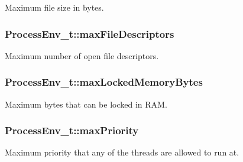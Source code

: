 Maximum file size in bytes. 

\subsubsection[{\texorpdfstring{max\+File\+Descriptors}{maxFileDescriptors}}]{ Process\+Env\+\_\+t\+::max\+File\+Descriptors}\hypertarget{struct_process_env__t_a988754ace3b62b5cafe7e3da54722ace}{}\label{struct_process_env__t_a988754ace3b62b5cafe7e3da54722ace}


Maximum number of open file descriptors. 

\subsubsection[{\texorpdfstring{max\+Locked\+Memory\+Bytes}{maxLockedMemoryBytes}}]{ Process\+Env\+\_\+t\+::max\+Locked\+Memory\+Bytes}\hypertarget{struct_process_env__t_a360a673bc3137fc006bfc9dfa56316ab}{}\label{struct_process_env__t_a360a673bc3137fc006bfc9dfa56316ab}


Maximum bytes that can be locked in R\+AM. 

\subsubsection[{\texorpdfstring{max\+Priority}{maxPriority}}]{ Process\+Env\+\_\+t\+::max\+Priority\hspace{0.3cm}{\ttfamily [private]}}\hypertarget{struct_process_env__t_aad9abe880793f0ca5159b88a97914192}{}\label{struct_process_env__t_aad9abe880793f0ca5159b88a97914192}


Maximum priority that any of the threads are allowed to run at. 

